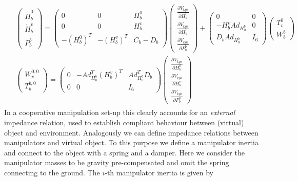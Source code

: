 \documentclass[a4paper,twoside, openright,12pt]{report}
\begin{document}
\begin{eqnarray} \label{EQ:externalimpedance}
\begin{aligned}
&\begin{pmatrix}\dot{H}_b^0 \\ \dot{H}_b^v \\  \dot{P_b^b}\end{pmatrix} =
\begin{pmatrix} 0 & 0 & H_b^0  \\ 0 & 0 & H_b^v \\
- (H_b^0)^T & -(H_b^v)^T & C_b-D_b\end{pmatrix}
\begin{pmatrix}\frac{\partial V_{kgs}}{\partial H_b^0}\\ \frac{\partial V_{kgs}}{\partial H_b^v} \\ \frac{\partial V_{kgs}}{\partial P_b^b}\end{pmatrix}+
\begin{pmatrix} 0 & 0\\ -H_b^v Ad_{H_0^b} & 0 \\ D_b Ad_{H_0^b} & I_6 \end{pmatrix}\begin{pmatrix} T_v^0 \\ W_{b}^b\end{pmatrix} \\
&\begin{pmatrix}W_v^{0,0} \\ T_b^{b,0}\end{pmatrix} = \begin{pmatrix}0 & -Ad_{H_0^b}^T (H_b^v)^T & Ad_{H_0^b}^T D_b\\ 0 & 0 & I_6 \end{pmatrix}
\begin{pmatrix}\frac{\partial V_{kgs}}{\partial H_b^0}\\ \frac{\partial V_{kgs}}{\partial H_b^v} \\ \frac{\partial V_{kgs}}{\partial P_b^b}\end{pmatrix}
\end{aligned}
\end{eqnarray}
In a cooperative manipulation set-up this clearly accounts for an \emph{external} impedance relation, used to establish compliant behaviour between (virtual) object and environment. Analogously we can define impedance relations between manipulators and virtual object. To this purpose we define a manipulator inertia and connect to the object with a spring and a damper. Here we consider the manipulator masses to be gravity pre-compensated and omit the spring connecting to the ground. The $i$-th manipulator inertia is given by
\end{document}
